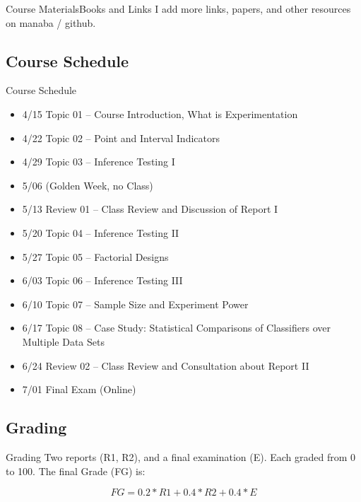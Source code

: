 \documentclass[aspectratio=169]{beamer}
\begin{document}
\begin{CJK}{UTF8}{ipxm}
\begin{frame}{Course Materials}{Books and Links}
  I add more links, papers, and other resources on manaba / github.
\end{frame}



\subsection{Course Schedule}
\begin{frame}{Course Schedule}{}
\begin{itemize}
  \item 4/15 Topic 01 -- Course Introduction, What is Experimentation
  \item 4/22 Topic 02 -- Point and Interval Indicators
  \item 4/29 Topic 03 -- Inference Testing I
  \item \alert{5/06 (Golden Week, no Class)}
  \item 5/13 Review 01 -- Class Review and Discussion of Report I
  \item 5/20 Topic 04 -- Inference Testing II
  \item 5/27 Topic 05 -- Factorial Designs
  \item 6/03 Topic 06 -- Inference Testing III
  \item 6/10 Topic 07 -- Sample Size and Experiment Power
  \item 6/17 Topic 08 -- Case Study: Statistical Comparisons of Classifiers over Multiple Data Sets
  \item 6/24 Review 02 -- Class Review and Consultation about Report II
  \item \alert{7/01 Final Exam (Online)}
\end{itemize}
\end{frame}



\subsection{Grading}
\begin{frame}{Grading}
  Two reports (R1, R2), and a final examination (E). Each graded from 0 to 100.
  The final Grade (FG) is:

  \begin{equation*}
    FG = 0.2*R1 + 0.4*R2 + 0.4*E
  \end{equation*}
  \bigskip


\end{frame}
\end{CJK}
\end{document}

